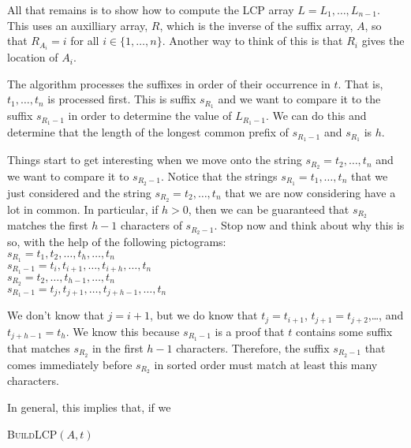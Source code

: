 All that remains is to show how to compute the LCP array $L=L_1,\ldots,L_{n-1}$.  This uses an auxilliary array, $R$, which is the inverse of the suffix array, $A$, so that $R_{A_i} = i$ for all $i\in\{1,\ldots,n\}$.  Another way to think of this is that $R_i$ gives the location of $A_i$.

The algorithm processes the suffixes in order of their occurrence in $t$.
That is, $t_1,\ldots,t_n$ is processed first.  This is suffix $s_{R_1}$
and we want to compare it to the suffix $s_{R_1-1}$ in order to determine
the value of $L_{R_1-1}$.  We can do this and determine that the length
of the longest common prefix of $s_{R_1-1}$ and $s_{R_1}$ is $h$.

Things start to get interesting when we move onto the string $s_{R_2}=t_2,\ldots,t_n$ and we want to compare it to $s_{R_2-1}$. Notice that the strings $s_{R_1}=t_1,\ldots,t_n$ that we just considered and the string $s_{R_2}=t_2,\ldots,t_n$ that we are now considering have a lot in common.  In particular, if $h>0$, then we can be guaranteed that $s_{R_2}$ matches the first $h-1$ characters of $s_{R_2-1}$.  Stop now and think about why this is so, with the help of the following pictograms:\\[\parskip]
$s_{R_1}=t_1,t_2,\ldots,t_h,\ldots,t_n$ \\
$s_{R_1-1}=t_i,t_{i+1},\ldots,t_{i+h},\ldots,t_n$ \\[\parskip]
$s_{R_2}=t_2,\ldots,t_{h-1},\ldots,t_n$\\
$s_{R_1-1}=t_j,t_{j+1},\ldots,t_{j+h-1},\ldots,t_n$ 

We don't know that $j=i+1$, but we do know that $t_j=t_{i+1}$,
$t_{j+1}=t_{j+2}$,\ldots, and $t_{j+h-1}=t_h$.  We know this because
$s_{R_1-1}$ is a proof that $t$ contains some suffix that matches
$s_{R_2}$ in the first $h-1$ characters.  Therefore, the suffix
$s_{R_2-1}$ that comes immediately before $s_{R_2}$ in sorted order must
match at least this many characters.

In general, this implies that, if we 

\noindent
\textsc{BuildLCP$(A,t)$}
\begin{algorithmic}
  \ENDFOR
        \ENDWHILE
    \ENDIF
  \ENDFOR
\end{algorithmic}


